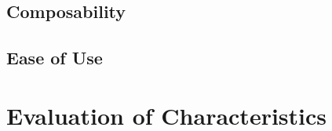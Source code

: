 \subsection{Composability}
\subsection{Ease of Use}

\section{Evaluation of Characteristics}

\label{sec:stm_eval}

\worksheetend